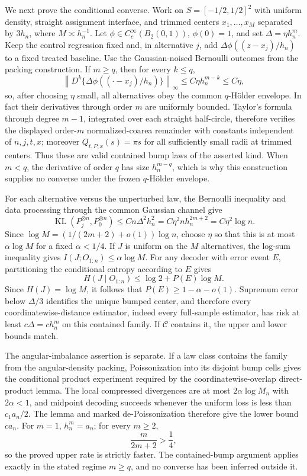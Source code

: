 We next prove the conditional converse.  Work on \(S=[-1/2,1/2]^2\) with uniform density, straight assignment interface, and trimmed centers \(x_1,\ldots,x_M\) separated by \(3h_n\), where \(M\asymp h_n^{-1}\).  Let \(\phi\in C_c^\infty(B_2(0,1))\), \(\phi(0)=1\), and set \(\Delta=\eta h_n^m\).  Keep the control regression fixed and, in alternative \(j\), add \(\Delta\phi((z-x_j)/h_n)\) to a fixed treated baseline.  Use the Gaussian-noised Bernoulli outcomes from the packing construction.  If \(m\geq q\), then for every \(k\leq q\),
\[
 \left\|D^k\{\Delta\phi((\cdot-x_j)/h_n)\}\right\|_\infty
 \leq C\eta h_n^{m-k}\leq C\eta,
\]
so, after choosing \(\eta\) small, all alternatives obey the common \(q\)-H\"older envelope.  In fact their derivatives through order \(m\) are uniformly bounded.  Taylor's formula through degree \(m-1\), integrated over each straight half-circle, therefore verifies the displayed order-\(m\) normalized-coarea remainder with constants independent of \(n,j,t,x\); moreover \(Q_{t,P,x}(s)=\pi s\) for all sufficiently small radii at trimmed centers.  Thus these are valid contained bump laws of the asserted kind.  When \(m<q\), the derivative of order \(q\) has size \(h_n^{m-q}\), which is why this construction supplies no converse under the frozen \(q\)-H\"older envelope.

For each alternative versus the unperturbed law, the Bernoulli inequality and data processing through the common Gaussian channel give
\[
 \operatorname{KL}(P_j^{\otimes n},P_0^{\otimes n})
 \leq Cn\Delta^2h_n^2
 =C\eta^2nh_n^{2m+2}=C\eta^2\log n.
\]
Since \(\log M=(1/(2m+2)+o(1))\log n\), choose \(\eta\) so that this is at most \(\alpha\log M\) for a fixed \(\alpha<1/4\).  If \(J\) is uniform on the \(M\) alternatives, the log-sum inequality gives \(I(J;O_{1:n})\leq\alpha\log M\).  For any decoder with error event \(E\), partitioning the conditional entropy according to \(E\) gives
\[
 H(J\mid O_{1:n})\leq\log2+P(E)\log M.
\]
Since \(H(J)=\log M\), it follows that \(P(E)\geq1-\alpha-o(1)\).  Supremum error below \(\Delta/3\) identifies the unique bumped center, and therefore every coordinatewise-distance estimator, indeed every full-sample estimator, has risk at least \(c\Delta=ch_n^m\) on this contained family.  If \(\mathcal C\) contains it, the upper and lower bounds match.

The angular-imbalance assertion is separate.  If a law class contains the family from the angular-density packing, Poissonization into its disjoint bump cells gives the conditional product experiment required by the coordinatewise-overlap direct-product lemma.  The local compressed divergences are at most \(2\alpha\log M_n\) with \(2\alpha<1\), and midpoint decoding succeeds whenever the uniform loss is less than \(c_1a_n/2\).  The lemma and marked de-Poissonization therefore give the lower bound \(ca_n\).  For \(m=1\), \(h_n^m=a_n\); for every \(m\geq2\),
\[
 \frac{m}{2m+2}>\frac14,
\]
so the proved upper rate is strictly faster.  The contained-bump argument applies exactly in the stated regime \(m\geq q\), and no converse has been inferred outside it.

